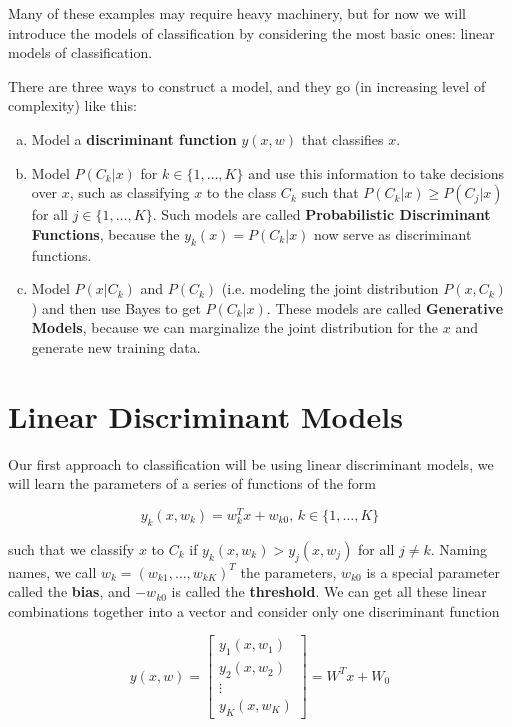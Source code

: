\documentclass{report}
\begin{document}
Many of these examples may require heavy machinery, but for now we will introduce the models of classification by considering the most basic ones: linear models of classification.

There are three ways to construct a model, and they go (in increasing level of complexity) like this:

\begin{enumerate}[(a)]
	\item Model a \textbf{discriminant function} $y(x,w)$ that classifies $x$.

	\item Model $P(C_k|x)$ for $k\in\{1,\dots,K\}$ and use this information to take decisions over $x$, such as classifying $x$ to the class $C_k$ such that $P(C_k|x) \geq P(C_j|x)$ for all $j\in\{1,\dots, K\}$. Such models are called \textbf{Probabilistic Discriminant Functions}, because the $y_k(x) = P(C_k|x)$ now serve as discriminant functions.

	\item Model $P(x|C_k)$ and $P(C_k)$ (i.e. modeling the joint distribution $P(x, C_k)$) and then use Bayes to get $P(C_k|x)$. These models are called \textbf{Generative Models}, because we can marginalize the joint distribution for the $x$ and generate new training data.
\end{enumerate}

\section{Linear Discriminant Models}

Our first approach to classification will be using linear discriminant models, we will learn the parameters of a series of functions of the form

\[y_k(x,w_k) = w_k^Tx + w_{k0},\, k\in\{1,\dots, K\}\]

such that we classify $x$ to $C_k$ if $y_k(x,w_k) > y_j(x,w_j)$ for all $j\neq k$. Naming names, we call $w_k = (w_{k1},\dots, w_{kK})^T$ the parameters, $w_{k0}$ is a special parameter called the \textbf{bias}, and $-w_{k0}$ is called the \textbf{threshold}. We can get all these linear combinations together into a vector and consider only one discriminant function

\[y(x,w) = \begin{bmatrix}
	y_1(x,w_1)\\
	y_2(x,w_2)\\
	\vdots\\
	y_K(x,w_K)
\end{bmatrix} = W^Tx + W_0\]
\end{document}

